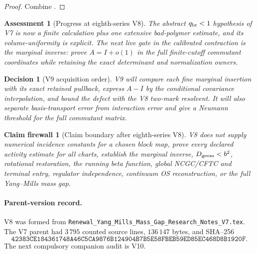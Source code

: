 \documentclass[11pt,oneside]{book}
\newtheorem{assessment}[theorem]{Assessment}
\newtheorem{firewall}[theorem]{Claim firewall}
\newtheorem{decision}[theorem]{Decision}
\theoremstyle{definition}
\theoremstyle{remark}
\begin{document}
\begin{proof}
Combine
.
\end{proof}

\begin{assessment}[Progress at eighth-series V8]
\label{ass:e8v8-status}
The abstract \(q_{\rm br}<1\) hypothesis of V7 is now a finite
calculation plus one extensive bad-polymer estimate, and its
volume-uniformity is explicit.  The next live gate in the calibrated
contraction is the marginal inverse: prove \(A=I+o(1)\) in the full
finite-cutoff commutant coordinates while retaining the exact
determinant and normalization owners.
\end{assessment}

\begin{decision}[V9 acquisition order]
\label{dec:e8v8-V9}
V9 will compare each fine marginal insertion with its exact retained
pullback, express \(A-I\) by the conditional covariance interpolation,
and bound the defect with the V8 two-mark resolvent.  It will also
separate basis-transport error from interaction error and give a
Neumann threshold for the full commutant matrix.
\end{decision}

\begin{firewall}[Claim boundary after eighth-series V8]
\label{fire:e8v8-claim}
V8 does not supply numerical incidence constants for a chosen block
map, prove every declared activity estimate for all charts, establish
the marginal inverse, \(D_{\rm geom}<b^2\), rotational restoration,
the running beta function, global NCGC/CFTC and terminal entry,
regulator independence, continuum OS reconstruction, or the full
Yang--Mills mass gap.
\end{firewall}

\paragraph{Parent-version record.}
V8 was formed from
\texttt{Renewal\_Yang\_Mills\_Mass\_Gap\_Research\_Notes\_V7.tex}.
The V7 parent had \(3\,795\) counted source lines,
\(136\,147\) bytes, and SHA--256
\[
\texttt{42383CE184361748A46C5CA9876B124904B7B5E58FBEB59ED85EC468D8B1920F}.
\]
The next compulsory companion audit is V10.

\end{document}
